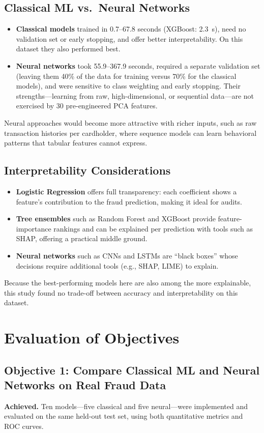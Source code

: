 \documentclass[journal]{IEEEtran}
\begin{document}
\subsection{Classical ML vs.\ Neural Networks}
\begin{itemize}
  \item \textbf{Classical models} trained in 0.7--67.8 seconds (XGBoost: 2.3~s), need no validation set or early stopping, and offer better interpretability. On this dataset they also performed best.
  \item \textbf{Neural networks} took 55.9--367.9 seconds, required a separate validation set (leaving them 40\% of the data for training versus 70\% for the classical models), and were sensitive to class weighting and early stopping. Their strengths---learning from raw, high-dimensional, or sequential data---are not exercised by 30 pre-engineered PCA features.
\end{itemize}
Neural approaches would become more attractive with richer inputs, such as raw transaction histories per cardholder, where sequence models can learn behavioral patterns that tabular features cannot express.

\subsection{Interpretability Considerations}
\begin{itemize}
  \item \textbf{Logistic Regression} offers full transparency: each coefficient shows a feature's contribution to the fraud prediction, making it ideal for audits.
  \item \textbf{Tree ensembles} such as Random Forest and XGBoost provide feature-importance rankings and can be explained per prediction with tools such as SHAP, offering a practical middle ground.
  \item \textbf{Neural networks} such as CNNs and LSTMs are ``black boxes'' whose decisions require additional tools (e.g., SHAP, LIME) to explain.
\end{itemize}
Because the best-performing models here are also among the more explainable, this study found no trade-off between accuracy and interpretability on this dataset.

\section{Evaluation of Objectives}
\subsection{Objective 1: Compare Classical ML and Neural Networks on Real Fraud Data}
\textbf{Achieved.} Ten models---five classical and five neural---were implemented and evaluated on the same held-out test set, using both quantitative metrics and ROC curves.
\end{document}
